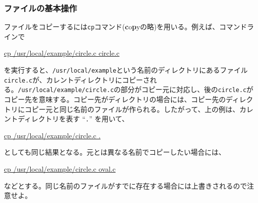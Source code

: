 \subsubsection{ファイルの基本操作}
ファイルをコピーするには{\tt cp}コマンド({\bf c}o{\bf p}yの略)を用いる。例えば、コマンドラインで
\begin{commandline2}
\prompt \underline{cp /usr/local/example/circle.c circle.c}
\end{commandline2} \noindent
を実行すると、{\tt /usr/local/example}という名前のディレクトリにあるファイル{\tt circle.c}が、カレントディレクトリにコピーされる。{\tt /usr/local/example/circle.c}の部分がコピー元に対応し、後の{\tt circle.c}がコピー先を意味する。コピー先がディレクトリの場合には、コピー先のディレクトリにコピー元と同じ名前のファイルが作られる。したがって、上の例は、カレントディレクトリを表す ``{\tt .}'' を用いて、
\begin{commandline2}
\prompt \underline{cp /usr/local/example/circle.c .}
\end{commandline2} \noindent
としても同じ結果となる。元とは異なる名前でコピーしたい場合には、
\begin{commandline2}
\prompt \underline{cp /usr/local/example/circle.c oval.c}
\end{commandline2} \noindent
などとする。同じ名前のファイルがすでに存在する場合には上書きされるので注意せよ。

